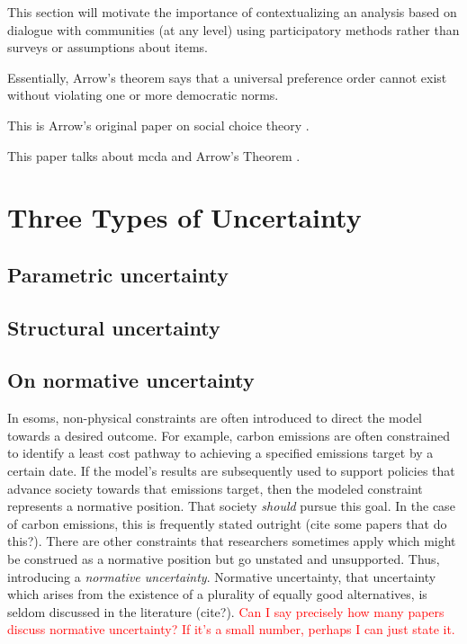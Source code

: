 This section will motivate the importance of contextualizing an analysis based on 
dialogue with communities (at any level) using participatory methods rather than
surveys or assumptions about items.

Essentially, Arrow's theorem says that a universal preference order cannot exist without
violating one or more democratic norms.

This is Arrow's original paper on social choice theory \cite{arrow_difficulty_1950}.

This paper talks about \ac{mcda} and Arrow's Theorem \cite{franssen_arrows_2005}.

\section{Three Types of Uncertainty}

\subsection{Parametric uncertainty}

\subsection{Structural uncertainty}

\subsection{On normative uncertainty}
In \acp{esom}, non-physical constraints are often introduced to direct the model
towards a desired outcome. For example, carbon emissions are often constrained
to identify a least cost pathway to achieving a specified emissions target by a
certain date. If the model's results are subsequently used to support policies
that advance society towards that emissions target, then the modeled constraint
represents a normative position. That society \textit{should} pursue this goal.
In the case of carbon emissions, this is frequently stated outright (cite some
papers that do this?). There are other constraints that researchers sometimes
apply which might be construed as a normative position but go unstated and
unsupported. Thus, introducing a \textit{normative uncertainty}. Normative
uncertainty, that uncertainty which arises from the existence of a plurality of
equally good alternatives, is seldom discussed in the literature (cite?).
\textcolor{red}{Can I say precisely how many papers discuss normative
uncertainty? If it's a small number, perhaps I can just state it.}

